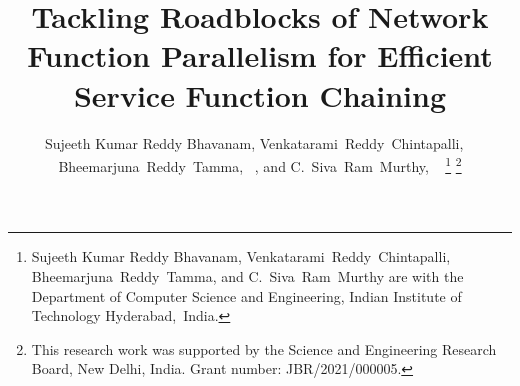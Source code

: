 \documentclass[journal]{IEEEtran}
\begin{document}
%
\title{Tackling Roadblocks of Network Function Parallelism for Efficient Service Function Chaining}
%
%
%

\author{Sujeeth Kumar Reddy Bhavanam, Venkatarami~Reddy~Chintapalli, ~ Bheemarjuna~Reddy~Tamma, ~, and C.~Siva~Ram~Murthy, ~
\thanks{Sujeeth Kumar Reddy Bhavanam, Venkatarami~Reddy~Chintapalli, Bheemarjuna~Reddy~Tamma, and C.~Siva~Ram~Murthy are with the Department of Computer Science and Engineering, Indian Institute of Technology Hyderabad,~India.}
\thanks{This research work was supported by the Science and Engineering Research Board, New Delhi, India. Grant number: JBR/2021/000005.}	
  
}


\end{document}
